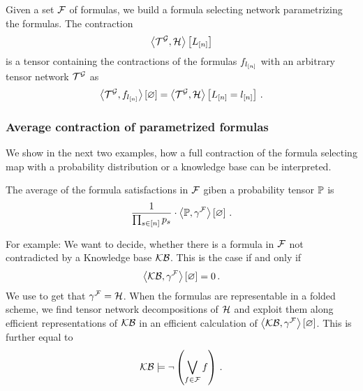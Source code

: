 Given a set $\mathcal{F}$ of formulas, we build a formula selecting network parametrizing the formulas.
The contraction 
\begin{align*}
	\left\langle \mathcal{T}^{\mathcal{G}},\mathcal{H}\right\rangle \left[ L_{[n]} \right] 
\end{align*}
is a tensor containing the contractions of the formulas $f_{l_{[n]}}$ with an arbitrary tensor network $\mathcal{T}^{\mathcal{G}}$ as
\begin{align*}
	\left\langle \mathcal{T}^{\mathcal{G}},f_{l_{[n]}}\right\rangle \left[ \varnothing \right] = \left\langle \mathcal{T}^{\mathcal{G}},\mathcal{H}\right\rangle \left[ L_{[n]}=l_{[n]} \right] \, . 
\end{align*}


\subsubsection{Average contraction of parametrized formulas}

We show in the next two examples, how a full contraction of the formula selecting map with a probability distribution or a knowledge base can be interpreted.

\begin{example}
	The average of the formula satisfactions in $\mathcal{F}$ giben a probability tensor $\mathbb{P}$ is 
		\[ \frac{1}{\prod_{s\in[n]}p_{s}} \cdot \left\langle \mathbb{P},\gamma^{\mathcal{F}}\right\rangle \left[ \varnothing \right] \, . \]
\end{example}


\begin{example}
	For example: We want to decide, whether there is a formula in $\mathcal{F}$ not contradicted by a Knowledge base $\mathcal{KB}$.
	This is the case if and only if 
		\[ \left\langle \mathcal{KB},\gamma^{\mathcal{F}}\right\rangle \left[ \varnothing \right] = 0 \, .  \]
	We use  to get that $\gamma^{\mathcal{F}}=\mathcal{H}$.
	When the formulas are representable in a folded scheme, we find tensor network decompositions of $\mathcal{H}$ and exploit them along efficient representations of $\mathcal{KB}$ in an efficient calculation of $\left\langle \mathcal{KB},\gamma^{\mathcal{F}}\right\rangle \left[ \varnothing \right] $.
	This is further equal to 
		\[ \mathcal{KB} \models \lnot \left( \bigvee_{f\in\mathcal{F}} f\right) \, . \]
\end{example}



%




